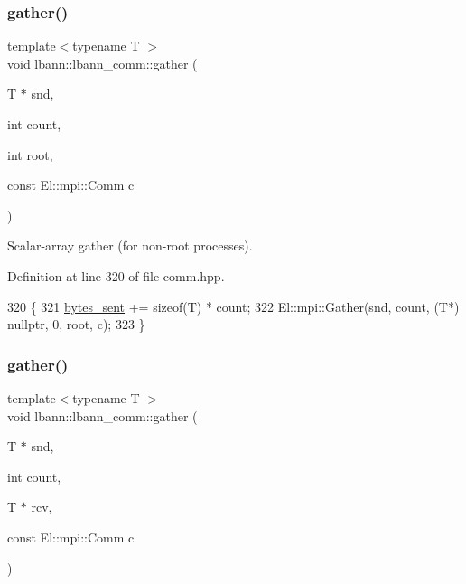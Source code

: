 \subsubsection{\texorpdfstring{gather()}{gather()}\hspace{0.1cm}{\footnotesize\ttfamily [4/5]}}
{\footnotesize\ttfamily template$<$typename T $>$ \\
void lbann\+::lbann\+\_\+comm\+::gather (\begin{DoxyParamCaption}\item[{T $\ast$}]{snd,  }\item[{int}]{count,  }\item[{int}]{root,  }\item[{const El\+::mpi\+::\+Comm}]{c }\end{DoxyParamCaption})\hspace{0.3cm}{\ttfamily [inline]}}

Scalar-\/array gather (for non-\/root processes). 

Definition at line 320 of file comm.\+hpp.


\begin{DoxyCode}
320                                                               \{
321     \hyperlink{classlbann_1_1lbann__comm_ad1f146ae7337ece6266fd307944928e0}{bytes\_sent} += \textcolor{keyword}{sizeof}(T) * count;
322     El::mpi::Gather(snd, count, (T*) \textcolor{keyword}{nullptr}, 0, root, c);
323   \}
\end{DoxyCode}
\mbox{\label{classlbann_1_1lbann__comm_a90680b777bcecb4d24392b3300919066}} 
\subsubsection{\texorpdfstring{gather()}{gather()}\hspace{0.1cm}{\footnotesize\ttfamily [5/5]}}
{\footnotesize\ttfamily template$<$typename T $>$ \\
void lbann\+::lbann\+\_\+comm\+::gather (\begin{DoxyParamCaption}\item[{T $\ast$}]{snd,  }\item[{int}]{count,  }\item[{T $\ast$}]{rcv,  }\item[{const El\+::mpi\+::\+Comm}]{c }\end{DoxyParamCaption})\hspace{0.3cm}{\ttfamily [inline]}}

